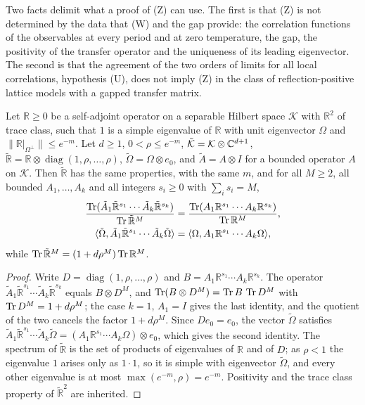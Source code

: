 Two facts delimit what a proof of (Z) can use. The first is that (Z) is
not determined by the data that (W) and the gap provide: the correlation
functions of the observables at every period and at zero temperature, the
gap, the positivity of the transfer operator and the uniqueness of its
leading eigenvector. The second is that the agreement of the two orders of
limits for all local correlations, hypothesis (U), does not imply (Z) in the
class of reflection-positive lattice models with a gapped transfer matrix.

\begin{proposition}\label{prop:invisible}
Let $\mathbb R\ge0$ be a self-adjoint operator on a separable Hilbert space
$\mathcal K$ with $\mathbb R^2$ of trace class, such that $1$ is a simple
eigenvalue of $\mathbb R$ with unit eigenvector $\Omega$ and
$\|\mathbb R|_{\Omega^\perp}\|\le e^{-m}$. Let $d\ge1$, $0<\rho\le e^{-m}$,
$\tilde{\mathcal K}=\mathcal K\otimes\mathbb{C}^{d+1}$, $\tilde{\mathbb R}=\mathbb R
\otimes\operatorname{diag}(1,\rho,\dots,\rho)$, $\tilde\Omega=\Omega\otimes
e_0$, and $\tilde A=A\otimes I$ for a bounded operator $A$ on $\mathcal K$.
Then $\tilde{\mathbb R}$ has the same properties, with the same $m$, and for
all $M\ge2$, all bounded $A_1,\dots,A_k$ and all integers $s_i\ge0$ with
$\sum_is_i=M$,
\begin{gather*}
\frac{\operatorname{Tr}(\tilde A_1\tilde{\mathbb R}^{s_1}\cdots\tilde A_k\tilde{\mathbb R}^{s_k})}
{\operatorname{Tr}\tilde{\mathbb R}^M}=\frac{\operatorname{Tr}(A_1\mathbb R^{s_1}\cdots A_k\mathbb R^{s_k})}
{\operatorname{Tr}\mathbb R^M},\\
\langle \tilde\Omega,\tilde A_1\tilde{\mathbb R}^{s_1}\cdots\tilde A_k\tilde\Omega\rangle
=\langle \Omega,A_1\mathbb R^{s_1}\cdots A_k\Omega\rangle,
\end{gather*}
while $\operatorname{Tr}\tilde{\mathbb R}^M=(1+d\rho^M)\operatorname{Tr}\mathbb R^M$.
\end{proposition}

\begin{proof}
Write $D=\operatorname{diag}(1,\rho,\dots,\rho)$ and $B=A_1\mathbb
R^{s_1}\cdots A_k\mathbb R^{s_k}$. The operator $\tilde A_1\tilde{\mathbb
R}^{s_1}\cdots\tilde A_k\tilde{\mathbb R}^{s_k}$ equals $B\otimes D^M$, and
$\operatorname{Tr}(B\otimes D^M)=\operatorname{Tr} B\,\operatorname{Tr} D^M$ with $\operatorname{Tr} D^M=1+d\rho^M$; the case $k=1$,
$A_1=I$ gives the last identity, and the quotient of the two cancels the
factor $1+d\rho^M$. Since $De_0=e_0$, the vector $\tilde\Omega$ satisfies
$\tilde A_1\tilde{\mathbb R}^{s_1}\cdots\tilde A_k\tilde\Omega=
(A_1\mathbb R^{s_1}\cdots A_k\Omega)\otimes e_0$, which gives the second
identity. The
spectrum of $\tilde{\mathbb R}$ is the set of products of eigenvalues of
$\mathbb R$ and of $D$; as $\rho<1$ the eigenvalue $1$ arises only as
$1\cdot1$, so it is simple with eigenvector $\tilde\Omega$, and every other
eigenvalue is at most $\max(e^{-m},\rho)=e^{-m}$. Positivity and the trace
class property of $\tilde{\mathbb R}^2$ are inherited.
\end{proof}

